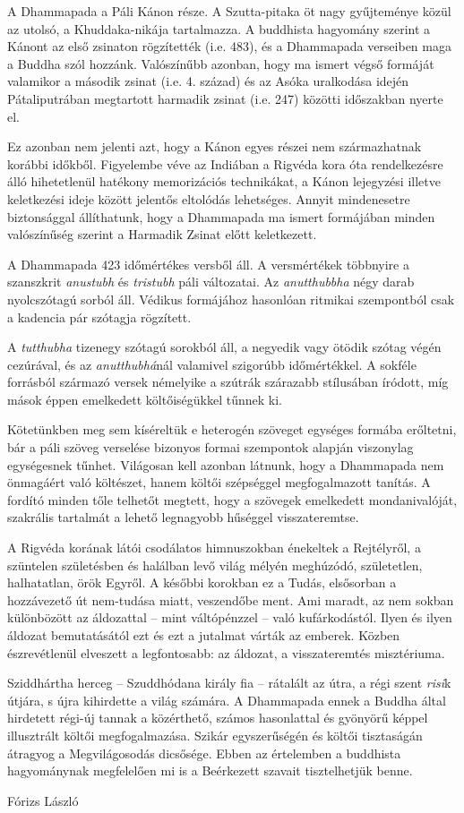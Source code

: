
A Dhammapada a Páli Kánon része. A Szutta-pitaka öt nagy gyűjteménye közül az utolsó, a Khuddaka-nikája tartalmazza. A buddhista hagyomány szerint a Kánont az első zsinaton rögzítették (i.e. 483), és a Dhammapada verseiben maga a Buddha szól hozzánk. Valószínűbb azonban, hogy ma ismert végső formáját valamikor a második zsinat (i.e. 4. század) és az Asóka uralkodása idején Pátaliputrában megtartott harmadik zsinat (i.e. 247) közötti időszakban nyerte el.

Ez azonban nem jelenti azt, hogy a Kánon egyes részei nem származhatnak korábbi időkből. Figyelembe véve az Indiában a Rigvéda kora óta rendelkezésre álló hihetetlenül hatékony memorizációs technikákat, a Kánon lejegyzési illetve keletkezési ideje között jelentős eltolódás lehetséges. Annyit mindenesetre biztonsággal állíthatunk, hogy a Dhammapada ma ismert formájában minden valószínűség szerint a Harmadik Zsinat előtt keletkezett.

A Dhammapada 423 időmértékes versből áll. A versmértékek többnyire a szanszkrit \textit{anustubh} és \textit{tristubh} páli változatai. Az \textit{anutthubbha} négy darab nyolcszótagú sorból áll. Védikus formájához hasonlóan ritmikai szempontból csak a kadencia pár szótagja rögzített.

A \textit{tutthubha} tizenegy szótagú sorokból áll, a negyedik vagy ötödik szótag végén cezúrával, és az \textit{anutthubhá}nál valamivel szigorúbb időmértékkel. A sokféle forrásból származó versek némelyike a szútrák szárazabb stílusában íródott, míg mások éppen emelkedett költőiségükkel tűnnek ki.

Kötetünkben meg sem kíséreltük e heterogén szöveget egységes formába erőltetni, bár a páli szöveg verselése bizonyos formai szempontok alapján viszonylag egységesnek tűnhet. Világosan kell azonban látnunk, hogy a Dhammapada nem önmagáért való költészet, hanem költői szépséggel megfogalmazott tanítás. A fordító minden tőle telhetőt megtett, hogy a szövegek emelkedett mondanivalóját, szakrális tartalmát a lehető legnagyobb hűséggel visszateremtse.

A Rigvéda korának látói csodálatos himnuszokban énekeltek a Rejtélyről, a szüntelen születésben és halálban levő világ mélyén meghúzódó, születetlen, halhatatlan, örök Egyről. A későbbi korokban ez a Tudás, elsősorban a hozzávezető út nem-tudása miatt, veszendőbe ment. Ami maradt, az nem sokban különbözött az áldozattal -- mint váltópénzzel -- való kufárkodástól. Ilyen és ilyen áldozat bemutatásától ezt és ezt a jutalmat várták az emberek. Közben észrevétlenül elveszett a legfontosabb: az áldozat, a visszateremtés misztériuma.

Sziddhártha herceg -- Szuddhódana király fia -- rátalált az útra, a régi szent \textit{risi}k útjára, s újra kihirdette a világ számára. A Dhammapada ennek a Buddha által hirdetett régi-új tannak a közérthető, számos hasonlattal és gyönyörű képpel illusztrált költői megfogalmazása. Szikár egyszerűségén és költői tisztaságán átragyog a Megvilágosodás dicsősége. Ebben az értelemben a buddhista hagyománynak megfelelően mi is a Beérkezett szavait tisztelhetjük benne.

\bigskip
{\raggedleft
Fórizs László
\par}

